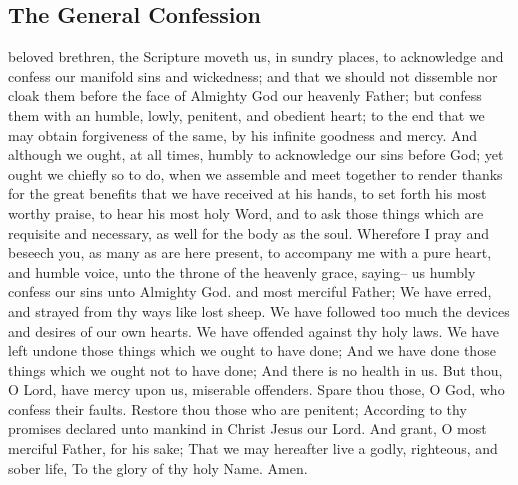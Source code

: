 \subsection{The General Confession}
 beloved brethren, the Scripture moveth us, in sundry places, to acknowledge and confess our manifold sins and wickedness; and that we should not dissemble nor cloak them before the face of Almighty God our heavenly Father; but confess them with an humble, lowly, penitent, and obedient heart; to the end that we may obtain forgiveness of the same, by his infinite goodness and mercy. And although we ought, at all times, humbly to acknowledge our sins before God; yet ought we chiefly so to do, when we assemble and meet together to render thanks for the great benefits that we have received at his hands, to set forth his most worthy praise, to hear his most holy Word, and to ask those things which are requisite and necessary, as well for the body as the soul. Wherefore I pray and beseech you, as many as are here present, to accompany me with a pure heart, and humble voice, unto the throne of the heavenly grace, saying--
 us humbly confess our sins unto Almighty God.
 and most merciful Father; We have erred, and strayed from thy ways like lost sheep. We have followed too much the devices and desires of our own hearts. We have offended against thy holy laws. We have left undone those things which we ought to have done; And we have done those things which we ought not to have done; And there is no health in us. But thou, O Lord, have mercy upon us, miserable offenders. Spare thou those, O God, who confess their faults. Restore thou those who are penitent; According to thy promises declared unto mankind in Christ Jesus our Lord. And grant, O most merciful Father, for his sake; That we may hereafter live a godly, righteous, and sober life, To the glory of thy holy Name. Amen.
